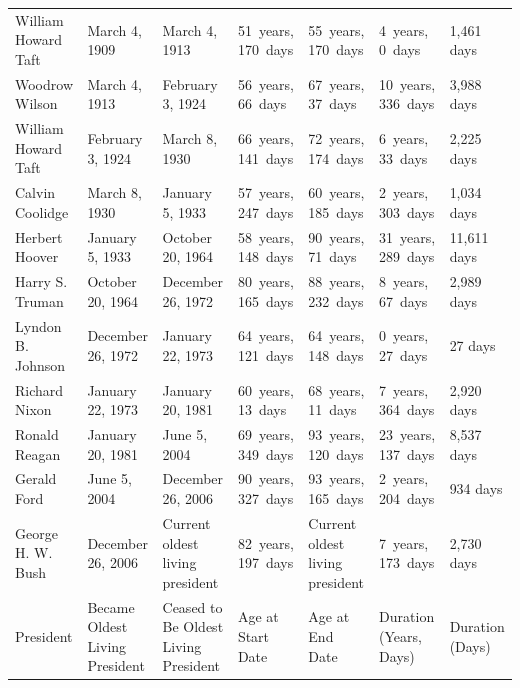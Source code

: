 \documentclass{article}
\begin{document}
\begin{tabular}{lllllll}
William Howard Taft & March 4, 1909 & March 4, 1913 & 51 years, 170 days & 55 years, 170 days & 4 years, 0 days & 1,461 days \\
Woodrow Wilson & March 4, 1913 & February 3, 1924 & 56 years, 66 days & 67 years, 37 days & 10 years, 336 days & 3,988 days \\
William Howard Taft & February 3, 1924 & March 8, 1930 & 66 years, 141 days & 72 years, 174 days & 6 years, 33 days & 2,225 days \\
Calvin Coolidge & March 8, 1930 & January 5, 1933 & 57 years, 247 days & 60 years, 185 days & 2 years, 303 days & 1,034 days \\
Herbert Hoover & January 5, 1933 & October 20, 1964 & 58 years, 148 days & 90 years, 71 days & 31 years, 289 days & 11,611 days \\
Harry S. Truman & October 20, 1964 & December 26, 1972 & 80 years, 165 days & 88 years, 232 days & 8 years, 67 days & 2,989 days \\
Lyndon B. Johnson & December 26, 1972 & January 22, 1973 & 64 years, 121 days & 64 years, 148 days & 0 years, 27 days & 27 days \\
Richard Nixon & January 22, 1973 & January 20, 1981 & 60 years, 13 days & 68 years, 11 days & 7 years, 364 days & 2,920 days \\
Ronald Reagan & January 20, 1981 & June 5, 2004 & 69 years, 349 days & 93 years, 120 days & 23 years, 137 days & 8,537 days \\
Gerald Ford & June 5, 2004 & December 26, 2006 & 90 years, 327 days & 93 years, 165 days & 2 years, 204 days & 934 days \\
George H. W. Bush & December 26, 2006 & Current oldest living president & 82 years, 197 days & Current oldest living president & 7 years, 173 days & 2,730 days \\
President & Became Oldest Living President & Ceased to Be Oldest Living President & Age at Start Date & Age at End Date & Duration (Years, Days) & Duration (Days) \\
\bottomrule
\end{tabular}
\end{document}
